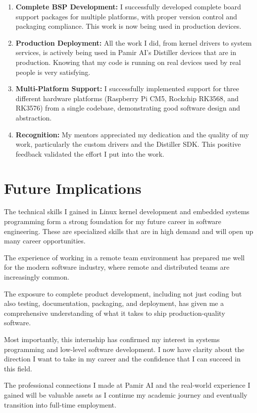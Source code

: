 \documentclass[12pt,a4paper]{report}
\begin{document}
\begin{enumerate}[itemsep=0.3cm]
    \item \textbf{Complete BSP Development:} I successfully developed complete board support packages for multiple platforms, with proper version control and packaging compliance. This work is now being used in production devices.

    \item \textbf{Production Deployment:} All the work I did, from kernel drivers to system services, is actively being used in Pamir AI's Distiller devices that are in production. Knowing that my code is running on real devices used by real people is very satisfying.

    \item \textbf{Multi-Platform Support:} I successfully implemented support for three different hardware platforms (Raspberry Pi CM5, Rockchip RK3568, and RK3576) from a single codebase, demonstrating good software design and abstraction.

    \item \textbf{Recognition:} My mentors appreciated my dedication and the quality of my work, particularly the custom drivers and the Distiller SDK. This positive feedback validated the effort I put into the work.
\end{enumerate}

\section{Future Implications}

The technical skills I gained in Linux kernel development and embedded systems programming form a strong foundation for my future career in software engineering. These are specialized skills that are in high demand and will open up many career opportunities.

\vspace{0.3cm}

The experience of working in a remote team environment has prepared me well for the modern software industry, where remote and distributed teams are increasingly common.

\vspace{0.3cm}

The exposure to complete product development, including not just coding but also testing, documentation, packaging, and deployment, has given me a comprehensive understanding of what it takes to ship production-quality software.

\vspace{0.3cm}

Most importantly, this internship has confirmed my interest in systems programming and low-level software development. I now have clarity about the direction I want to take in my career and the confidence that I can succeed in this field.

\vspace{0.3cm}

The professional connections I made at Pamir AI and the real-world experience I gained will be valuable assets as I continue my academic journey and eventually transition into full-time employment.
\end{document}
